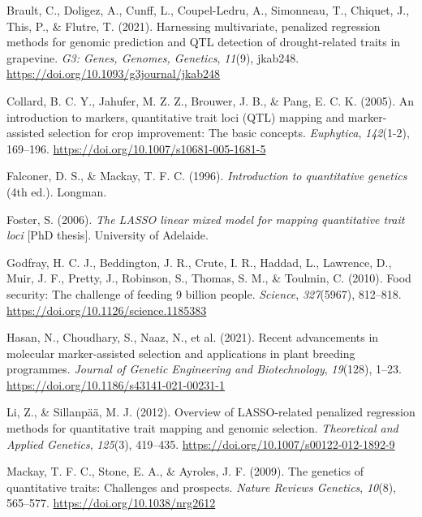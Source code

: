 \documentclass[
  letterpaper,
  DIV=11,
  numbers=noendperiod]{scrartcl}
\newlength{\cslhangindent}
\newenvironment{CSLReferences}[2] %
 {\begin{list}{}{%
  \setlength{\itemindent}{0pt}
  \setlength{\leftmargin}{0pt}
  \setlength{\parsep}{0pt}
  \ifodd #1
   \setlength{\leftmargin}{\cslhangindent}
   \setlength{\itemindent}{-1\cslhangindent}
  \fi
  \setlength{\itemsep}{#2\baselineskip}}}
 {\end{list}}
\begin{document}
\label{refs}
\begin{CSLReferences}{1}{0}
Brault, C., Doligez, A., Cunff, L., Coupel-Ledru, A., Simonneau, T.,
Chiquet, J., This, P., \& Flutre, T. (2021). Harnessing multivariate,
penalized regression methods for genomic prediction and QTL detection of
drought-related traits in grapevine. \emph{G3: Genes, Genomes,
Genetics}, \emph{11}(9), jkab248.
\url{https://doi.org/10.1093/g3journal/jkab248}

Collard, B. C. Y., Jahufer, M. Z. Z., Brouwer, J. B., \& Pang, E. C. K.
(2005). An introduction to markers, quantitative trait loci (QTL)
mapping and marker-assisted selection for crop improvement: The basic
concepts. \emph{Euphytica}, \emph{142}(1-2), 169--196.
\url{https://doi.org/10.1007/s10681-005-1681-5}

Falconer, D. S., \& Mackay, T. F. C. (1996). \emph{Introduction to
quantitative genetics} (4th ed.). Longman.

Foster, S. (2006). \emph{The LASSO linear mixed model for mapping
quantitative trait loci} {[}PhD thesis{]}. University of Adelaide.

Godfray, H. C. J., Beddington, J. R., Crute, I. R., Haddad, L.,
Lawrence, D., Muir, J. F., Pretty, J., Robinson, S., Thomas, S. M., \&
Toulmin, C. (2010). Food security: The challenge of feeding 9 billion
people. \emph{Science}, \emph{327}(5967), 812--818.
\url{https://doi.org/10.1126/science.1185383}

Hasan, N., Choudhary, S., Naaz, N., et al. (2021). Recent advancements
in molecular marker-assisted selection and applications in plant
breeding programmes. \emph{Journal of Genetic Engineering and
Biotechnology}, \emph{19}(128), 1--23.
\url{https://doi.org/10.1186/s43141-021-00231-1}

Li, Z., \& Sillanpää, M. J. (2012). Overview of LASSO-related penalized
regression methods for quantitative trait mapping and genomic selection.
\emph{Theoretical and Applied Genetics}, \emph{125}(3), 419--435.
\url{https://doi.org/10.1007/s00122-012-1892-9}

Mackay, T. F. C., Stone, E. A., \& Ayroles, J. F. (2009). The genetics
of quantitative traits: Challenges and prospects. \emph{Nature Reviews
Genetics}, \emph{10}(8), 565--577. \url{https://doi.org/10.1038/nrg2612}


\end{CSLReferences}
\end{document}
